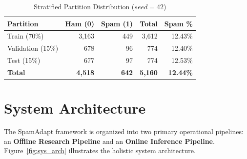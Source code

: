 \documentclass[conference]{IEEEtran}
\begin{document}
\begin{table}[htbp]
\caption{Stratified Partition Distribution ($seed=42$)}
\label{tab:splits}
\centering
\begin{tabular}{lrrrr}
\toprule
\textbf{Partition} & \textbf{Ham (0)} & \textbf{Spam (1)} & \textbf{Total} & \textbf{Spam \%} \\
\midrule
Train (70\%) & 3,163 & 449 & 3,612 & 12.43\% \\
Validation (15\%) & 678 & 96 & 774 & 12.40\% \\
Test (15\%) & 677 & 97 & 774 & 12.53\% \\
\midrule
\textbf{Total} & \textbf{4,518} & \textbf{642} & \textbf{5,160} & \textbf{12.44\%} \\
\bottomrule
\end{tabular}
\end{table}

\section{System Architecture}
\label{sec:system_arch}

The SpamAdapt framework is organized into two primary operational pipelines: an \textbf{Offline Research Pipeline} and an \textbf{Online Inference Pipeline}. Figure~\ref{fig:sys_arch} illustrates the holistic system architecture.
\end{document}

